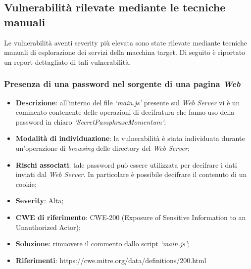 \documentclass[a4paper,11pt,oneside,top=3cm,bottom=3cm,left=3.5cm,right=3.5cm,openright,reqno,table]{book}
\begin{document}
\subsection{Vulnerabilità rilevate mediante le tecniche manuali}
Le vulnerabilità aventi severity più elevata sono state rilevate mediante tecniche manuali di esplorazione dei servizi della macchina target. Di seguito è riportato un report dettagliato di tali vulnerabilità.

\subsubsection{Presenza di una password nel sorgente di una pagina \emph{Web}}
\begin{itemize}
    \item \textbf{Descrizione}: all'interno del file \emph{`main.js'} presente sul \emph{Web Server} vi è un commento contenente delle operazioni di decifratura che fanno uso della password in chiaro \emph{`SecretPassphraseMomentum'};
    \item \textbf{Modalità di individuazione}: la vulnerabilità è stata individuata durante un'operazione di \emph{browsing} delle directory del \emph{Web Server};
    \item \textbf{Rischi associati}: tale password può essere utilizzata per decifrare i dati inviati dal \emph{Web Server}. In particolare è possibile decifrare il contenuto di un cookie;
    \item \textbf{Severity}: Alta;
    \item \textbf{CWE di riferimento}: CWE-200 (Exposure of Sensitive Information to an Unauthorized Actor);
    \item \textbf{Soluzione}: rimuovere il commento dallo script \emph{`main.js'};
    \item \textbf{Riferimenti}: https://cwe.mitre.org/data/definitions/200.html
\end{itemize}
\end{document}
